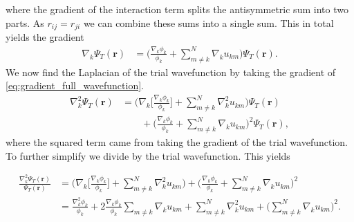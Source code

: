 \documentclass[
    a4paper, aps, twocolumn, floatfix, superscriptaddress]{revtex4-1}
\newcommand{\vf}{\mathbf}
\newcommand{\1}{\mathds{1}}
\begin{document}
            where the gradient of the interaction term splits the antisymmetric
            sum into two parts. As $r_{ij} = r_{ji}$ we can combine these sums
            into a single sum. This in total yields the gradient
            \begin{align}
                \nabla_k\Psi_T(\vf{r})
                &=
                \Biggl(
                    \frac{\nabla_k\phi_k}{\phi_k}
                    + \sum_{m \neq k}^N
                    \nabla_k u_{km}
                \Biggr)
                \Psi_T(\vf{r}).
                \label{eq:gradient_full_wavefunction}
            \end{align}
            We now find the Laplacian of the trial wavefunction by taking the
            gradient of \autoref{eq:gradient_full_wavefunction}.
            \begin{align}
                \nabla_k^2\Psi_T(\vf{r})
                &=
                \Biggl(
                    \nabla_k\Biggl[
                        \frac{\nabla_k\phi_k}{\phi_k}
                    \Biggr]
                    +
                    \sum_{m \neq k}^N \nabla_k^2 u_{km}
                \Biggr)\Psi_T(\vf{r})
                \\
                &\qquad
                +
                \Biggl(
                    \frac{\nabla_k\phi_k}{\phi_k}
                    + \sum_{m \neq k}^N
                    \nabla_k u_{km}
                \Biggr)^2
                \Psi_T(\vf{r}),
            \end{align}
            where the squared term came from taking the gradient of the trial
            wavefunction.  To further simplify we divide by the trial
            wavefunction. This yields
            \begin{widetext}
                \begin{align}
                    \frac{\nabla_k^2\Psi_T(\vf{r})}{\Psi_T(\vf{r})}
                    &=
                    \Biggl(
                        \nabla_k\Biggl[
                            \frac{\nabla_k\phi_k}{\phi_k}
                        \Biggr]
                        +
                        \sum_{m \neq k}^N \nabla_k^2 u_{km}
                    \Biggr)
                    +
                    \Biggl(
                        \frac{\nabla_k\phi_k}{\phi_k}
                        + \sum_{m \neq k}^N
                        \nabla_k u_{km}
                    \Biggr)^2 \\
                    &=
                    \frac{\nabla_k^2\phi_k}{\phi_k}
                    + 2\frac{\nabla_k\phi_k}{\phi_k}
                    \sum_{m \neq k}\nabla_k u_{km}
                    + \sum_{m\neq k}^N\nabla_k^2 u_{km}
                    + \Biggl(
                        \sum_{m \neq k}^N\nabla_k u_{km}
                    \Biggr)^2.
                \end{align}
            \end{widetext}
\end{document}
